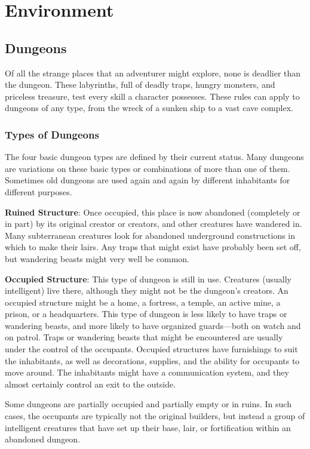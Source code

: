 \chapter{Environment}
\section{Dungeons}

\label{f0}				
Of all the strange places that an adventurer might explore, none is deadlier than the dungeon. These labyrinths, full of deadly traps, hungry monsters, and priceless treasure, test every skill a character possesses. These rules can apply to dungeons of any type, from the wreck of a sunken ship to a vast cave complex.
				
\subsection{Types of Dungeons}

				
The four basic dungeon types are defined by their current status. Many dungeons are variations on these basic types or combinations of more than one of them. Sometimes old dungeons are used again and again by different inhabitants for different purposes.
				
\textbf{Ruined Structure}: Once occupied, this place is now abandoned (completely or in part) by its original creator or creators, and other creatures have wandered in. Many subterranean creatures look for abandoned underground constructions in which to make their lairs. Any traps that might exist have probably been set off, but wandering beasts might very well be common.
				
\textbf{Occupied Structure}: This type of dungeon is still in use. Creatures (usually intelligent) live there, although they might not be the dungeon's creators. An occupied structure might be a home, a fortress, a temple, an active mine, a prison, or a headquarters. This type of dungeon is less likely to have traps or wandering beasts, and more likely to have organized guards---both on watch and on patrol. Traps or wandering beasts that might be encountered are usually under the control of the occupants. Occupied structures have furnishings to suit the inhabitants, as well as decorations, supplies, and the ability for occupants to move around. The inhabitants might have a communication system, and they almost certainly control an exit to the outside.
				
Some dungeons are partially occupied and partially empty or in ruins. In such cases, the occupants are typically not the original builders, but instead a group of intelligent creatures that have set up their base, lair, or fortification within an abandoned dungeon.
				
